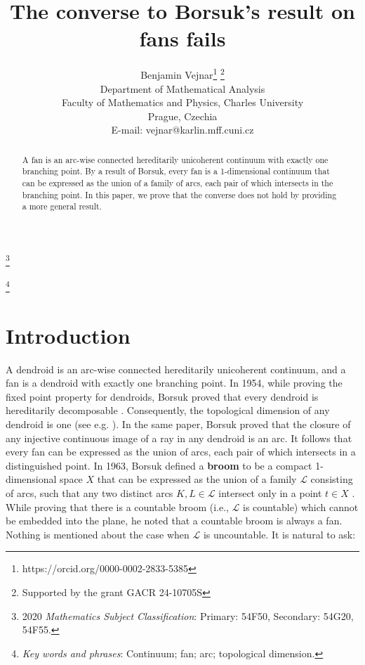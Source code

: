 \documentclass[12pt]{article}
\title{The converse to Borsuk’s result on fans fails}
\author{
Benjamin Vejnar\footnote{https://orcid.org/0000-0002-2833-5385} \footnote{
Supported by the grant GACR 24-10705S
}\\
Department of Mathematical Analysis\\ 
Faculty of Mathematics and Physics, Charles University\\
Prague, Czechia\\
E-mail: vejnar@karlin.mff.cuni.cz}
\theoremstyle{definition}
\theoremstyle{remark}
\begin{document}
\maketitle

\renewcommand{\thefootnote}{}

\footnote{2020 \emph{Mathematics Subject Classification}: Primary: 54F50, Secondary: 54G20, 54F55.}  %

\footnote{\emph{Key words and phrases}: Continuum; fan; arc; topological dimension.}


\begin{abstract}
A fan is an arc-wise connected hereditarily unicoherent continuum with exactly one branching point.
By a result of Borsuk, every fan is a 1-dimensional continuum that can be expressed as the union of a family of arcs, each pair of which intersects in the branching point.
In this paper, we prove that the converse does not hold by providing a more general result.
\end{abstract}

\section{Introduction}
A dendroid is an arc-wise connected hereditarily unicoherent continuum, and a fan is a dendroid with exactly one branching point.
In 1954, while proving the fixed point property for dendroids, Borsuk proved that every dendroid is hereditarily decomposable \cite{Borsuk}. Consequently, the topological dimension of any dendroid is one (see e.g. \cite{CharatonikDednroids}). In the same paper, Borsuk proved that the closure of any injective continuous image of a ray in any dendroid is an arc. It follows that every fan can be expressed as the union of arcs, each pair of which intersects in a distinguished point.
In 1963, Borsuk defined a \textbf{broom} to be a compact 1-dimensional space $X$ that can be expressed as the union of a family $\mathcal L$ consisting of arcs, such that any two distinct arcs $K, L\in\mathcal L$ intersect only in a point $t\in X$ \cite{BorsukBrooms}.
While proving that there is a countable broom (i.e., $\mathcal L$ is countable) which cannot be embedded into the plane, he noted that a countable broom is always a fan.
Nothing is mentioned about the case when $\mathcal L$ is uncountable. 
It is natural to ask:
\end{document}
